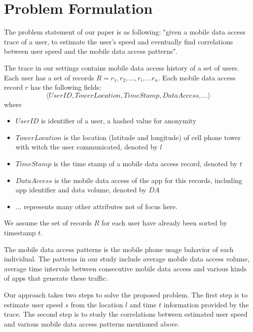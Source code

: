 \section{Problem Formulation}
The problem statement of our paper is as following: "given a mobile data access trace of a user, to estimate the user's speed and eventually find correlations between user speed and the mobile data access patterns". 

The trace in our settings contains mobile data access history of a set of users. Each user has a set of records $R = {r_1, r_2, ...,r_i, ... r_n}$.
Each mobile data access record $r$ has the following fields:
\begin{equation*}
  \langle UserID, TowerLocation, TimeStamp, DataAccess, \dots \rangle
\end{equation*}
where
\begin{itemize}
  \item $UserID$ is identifier of a user, a hashed value for anonymity
  \item $TowerLocation$ is the location (latitude and longitude) of cell phone tower with witch the user communicated, denoted by $l$
  \item $TimeStamp$ is the time stamp of a mobile data access record, denoted by $t$
  \item $DataAccess$ is the mobile data access of the app for this records, including app identifier and data volume, denoted by $DA$
  \item ... represents many other attributes not of focus here.
\end{itemize}
We assume the set of records $R$ for each user have already been sorted by timestamp $t$.

The mobile data access patterns is the mobile phone usage bahavior of each individual. The patterns in our study include average mobile data access volume, average time intervals between consecutive mobile data access and various kinds of apps that generate these traffic.

Our approach takes two steps to solve the proposed problem. The first step is to estimate user speed $s$ from the location $l$ and time $t$ information provided by the trace. The second step is to study the correlations between estimated user speed and various mobile data access patterns mentioned above.

